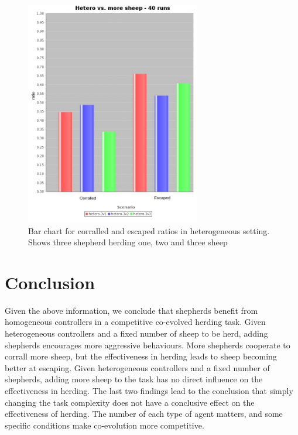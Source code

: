 \documentclass[conference]{IEEEtran}
\begin{document}
\begin{figure}[ht]
	\centering
	\includegraphics[width=3in]{imgs/hetero_3v1-hetero_3v2-hetero_3v3-ratio-bar.jpg}
	\caption{Bar chart for corralled and escaped ratios in heterogeneous setting. Shows three shepherd herding one, two and three sheep}
	\label{fig:ratios_threeShepherd}
\end{figure}

\section{Conclusion}
\label{sec:conclusion}
Given the above information, we conclude that shepherds benefit from homogeneous controllers in a competitive co-evolved herding task. 
Given heterogeneous controllers and a fixed number of sheep to be herd, adding shepherds encourages more aggressive behaviours. More shepherds cooperate to corrall more sheep, but the effectiveness in herding leads to sheep becoming better at escaping. 
Given heterogeneous controllers and a fixed number of shepherds, adding more sheep to the task has no direct influence on the effectiveness in herding.
The last two findings lead to the conclusion that simply changing the task complexity does not have a conclusive effect on the effectiveness of herding. The number of each type of agent matters, and some specific conditions make co-evolution more competitive.





\end{document}
